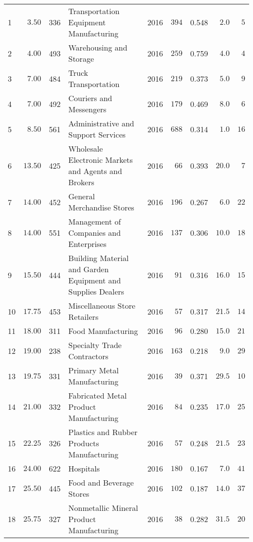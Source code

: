 \documentclass[9pt, oneside]{article}   	%
\begin{document}
\begin{longtable}{lccp{3in}ccccc}
1  & $\phantom{0}3.50$ & 336 & Transportation Equipment Manufacturing & 2016 & $394$ & 0.548 & $\phantom{0}2.0$ & $\phantom{0}5$ \\
2  & $\phantom{0}4.00$ & 493 & Warehousing and Storage & 2016 & $259$ & 0.759 & $\phantom{0}4.0$ & $\phantom{0}4$ \\
3  & $\phantom{0}7.00$ & 484 & Truck Transportation & 2016 & $219$ & 0.373 & $\phantom{0}5.0$ & $\phantom{0}9$ \\
4  & $\phantom{0}7.00$ & 492 & Couriers and Messengers & 2016 & $179$ & 0.469 & $\phantom{0}8.0$ & $\phantom{0}6$ \\
5  & $\phantom{0}8.50$ & 561 & Administrative and Support Services & 2016 & $688$ & 0.314 & $\phantom{0}1.0$ & $16$ \\
6  & $13.50$ & 425 & Wholesale Electronic Markets and Agents and Brokers & 2016 & $\phantom{0}66$ & 0.393 & $20.0$ & $\phantom{0}7$ \\
7  & $14.00$ & 452 & General Merchandise Stores & 2016 & $196$ & 0.267 & $\phantom{0}6.0$ & $22$ \\
8  & $14.00$ & 551 & Management of Companies and Enterprises & 2016 & $137$ & 0.306 & $10.0$ & $18$ \\
9  & $15.50$ & 444 & Building Material and Garden Equipment and Supplies Dealers & 2016 & $\phantom{0}91$ & 0.316 & $16.0$ & $15$ \\
10  & $17.75$ & 453 & Miscellaneous Store Retailers & 2016 & $\phantom{0}57$ & 0.317 & $21.5$ & $14$ \\
11  & $18.00$ & 311 & Food Manufacturing & 2016 & $\phantom{0}96$ & 0.280 & $15.0$ & $21$ \\
12  & $19.00$ & 238 & Specialty Trade Contractors & 2016 & $163$ & 0.218 & $\phantom{0}9.0$ & $29$ \\
13  & $19.75$ & 331 & Primary Metal Manufacturing & 2016 & $\phantom{0}39$ & 0.371 & $29.5$ & $10$ \\
14  & $21.00$ & 332 & Fabricated Metal Product Manufacturing & 2016 & $\phantom{0}84$ & 0.235 & $17.0$ & $25$ \\
15  & $22.25$ & 326 & Plastics and Rubber Products Manufacturing & 2016 & $\phantom{0}57$ & 0.248 & $21.5$ & $23$ \\
16  & $24.00$ & 622 & Hospitals & 2016 & $180$ & 0.167 & $\phantom{0}7.0$ & $41$ \\
17  & $25.50$ & 445 & Food and Beverage Stores & 2016 & $102$ & 0.187 & $14.0$ & $37$ \\
18  & $25.75$ & 327 & Nonmetallic Mineral Product Manufacturing & 2016 & $\phantom{0}38$ & 0.282 & $31.5$ & $20$ \\

\end{longtable}
\end{document}
